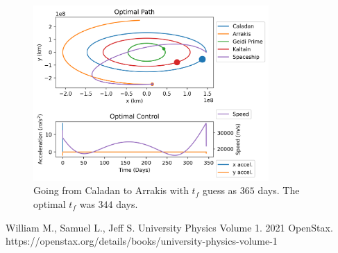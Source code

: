 \documentclass[11pt]{amsart}
\begin{document}
\begin{figure}[htp]
    \centering
    \includegraphics[width=0.8\textwidth]{f5.png}\hfill
    \caption{Going from Caladan to Arrakis with $t_f$ guess as $365$ days. The optimal $t_f$ was $344$ days.}
    \label{fig:free_time_no_sun}
\end{figure}







\FloatBarrier %
\newpage


\begin{thebibliography}{99}
 William M., Samuel L., Jeff S. University Physics Volume 1. 2021 OpenStax. https://openstax.org/details/books/university-physics-volume-1 

\end{thebibliography}
\end{document}
